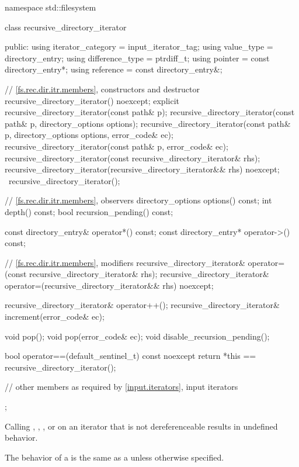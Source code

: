\begin{codeblock}
namespace std::filesystem {
  class recursive_directory_iterator {
  public:
    using iterator_category = input_iterator_tag;
    using value_type        = directory_entry;
    using difference_type   = ptrdiff_t;
    using pointer           = const directory_entry*;
    using reference         = const directory_entry&;

    // \ref{fs.rec.dir.itr.members}, constructors and destructor
    recursive_directory_iterator() noexcept;
    explicit recursive_directory_iterator(const path& p);
    recursive_directory_iterator(const path& p, directory_options options);
    recursive_directory_iterator(const path& p, directory_options options,
                                 error_code& ec);
    recursive_directory_iterator(const path& p, error_code& ec);
    recursive_directory_iterator(const recursive_directory_iterator& rhs);
    recursive_directory_iterator(recursive_directory_iterator&& rhs) noexcept;
    ~recursive_directory_iterator();

    // \ref{fs.rec.dir.itr.members}, observers
    directory_options  options() const;
    int                depth() const;
    bool               recursion_pending() const;

    const directory_entry& operator*() const;
    const directory_entry* operator->() const;

    // \ref{fs.rec.dir.itr.members}, modifiers
    recursive_directory_iterator&
      operator=(const recursive_directory_iterator& rhs);
    recursive_directory_iterator&
      operator=(recursive_directory_iterator&& rhs) noexcept;

    recursive_directory_iterator& operator++();
    recursive_directory_iterator& increment(error_code& ec);

    void pop();
    void pop(error_code& ec);
    void disable_recursion_pending();

    bool operator==(default_sentinel_t) const noexcept {
      return *this == recursive_directory_iterator();
    }

    // other members as required by \ref{input.iterators}, input iterators
  };
}
\end{codeblock}

\pnum
Calling , , ,
 or 
on an iterator that is not dereferenceable results in undefined behavior.

\pnum
The behavior of a  is the same
as a  unless otherwise specified.

